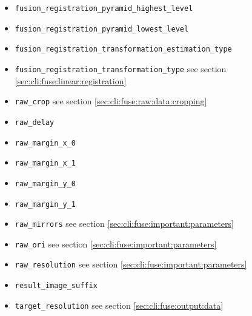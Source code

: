 \begin{itemize}
\item \texttt{fusion\_registration\_pyramid\_highest\_level}
\item \texttt{fusion\_registration\_pyramid\_lowest\_level}
\item \texttt{fusion\_registration\_transformation\_estimation\_type}
\item \texttt{fusion\_registration\_transformation\_type} see section \ref{sec:cli:fuse:linear:registration}
\item \texttt{raw\_crop} see section \ref{sec:cli:fuse:raw:data:cropping}
\item \texttt{raw\_delay}
\item \texttt{raw\_margin\_x\_0}
\item \texttt{raw\_margin\_x\_1}
\item \texttt{raw\_margin\_y\_0}
\item \texttt{raw\_margin\_y\_1}
\item \texttt{raw\_mirrors} see section \ref{sec:cli:fuse:important:parameters}
\item \texttt{raw\_ori} see section \ref{sec:cli:fuse:important:parameters}
\item \texttt{raw\_resolution} see section \ref{sec:cli:fuse:important:parameters}
\item \texttt{result\_image\_suffix}
\item \texttt{target\_resolution} see section \ref{sec:cli:fuse:output:data}
\end{itemize}
